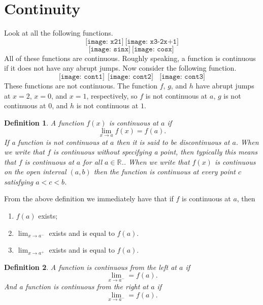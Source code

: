 \documentclass[12pt,a4paper]{book}
\numberwithin{equation}{section}
\newtheorem*{definition}{Definition}
\begin{document}
\newpage

\section{Continuity}

Look at all the following functions.
$$
	\texttt{[image: x21]}~	\texttt{[image: x3-2x+1]}$$ $$	\texttt{[image: sinx]}~\texttt{[image: cosx]}~
$$
All of these functions are continuous. Roughly speaking, a function is continuous if it does not have any abrupt jumps. Now consider the following function.
	$$\texttt{[image: cont1]}~~\texttt{[image: cont2]} ~~~~\texttt{[image: cont3]}$$
These functions are not continuous. The function $f$, $g$, and $h$ have abrupt jumps at $x=2$, $x=0$, and $x=1$, respectively, so $f$ is not continuous at $a$, $g$ is not continuous at $0$, and $h$ is not continuous at $1$.

\begin{tcolorbox}[width=\textwidth,colback={green!20},title={},colbacktitle=yellow,coltitle=blue] 
\begin{definition}
	A function $f(x)$ is continuous at $a$ if 
	$$\lim_{x\to a}f(x)=f(a).$$
If a function is not continuous at $a$ then it is said to be discontinuous at $a$. 
When we write that $f$ is continuous without specifying a point, then typically
this means that $f$ is continuous at $a$ for all $a\in \mathbb{R}$..
When we write that $f(x)$ is continuous on the open interval $(a, b)$ then the function
is continuous at every point $c$ satisfying $a< c<b$.
\end{definition}
\end{tcolorbox}
From the above definition we immediately have that if $f$ is continuous at $a$, then 
\begin{enumerate}
	\item $f(a)$ exists;
	\item $\lim_{x\to a^-}$ exists and is equal to $f(a)$.
		\item $\lim_{x\to a^+}$ exists and is equal to $f(a)$.
\end{enumerate}

\begin{tcolorbox}[width=\textwidth,colback={green!20},title={},colbacktitle=yellow,coltitle=blue] 
\begin{definition}
	A function is continuous from the left at $a$ if 
	$$\lim_{x\to a^-}=f(a).$$ And 
		a function is continuous from the right at $a$ if 
		$$\lim_{x\to a^-}=f(a).$$
\end{definition}
\end{tcolorbox}
\end{document}
